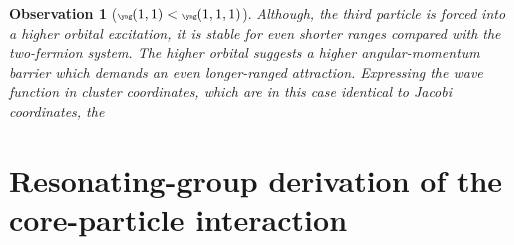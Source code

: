 \documentclass[aps,prd,onecolumn
,tightenlines,letterpaper,
notitlepage,11pt,linenumbers,
nofootinbib]{revtex4-1}
\begin{document}
\newtheorem{obs}{Observation}

\begin{obs}[${\tiny\yng(1,1)}<{\tiny\yng(1,1,1)}$]
Although, the third particle is forced into a higher orbital excitation, it is stable for even shorter ranges compared with the two-fermion system.
The higher orbital suggests a higher angular-momentum barrier which demands an even longer-ranged attraction. Expressing the wave function in cluster
coordinates, which are in this case identical to Jacobi coordinates, the 
\end{obs}

\section{Resonating-group derivation of the core-particle interaction}
\end{document}
